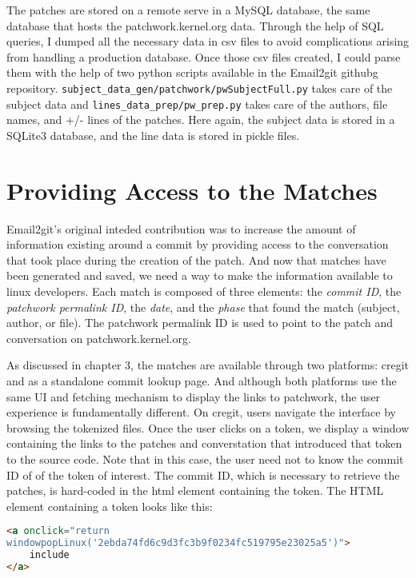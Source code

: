 The patches are stored on a remote serve in a MySQL database, the same database that hosts the patchwork.kernel.org data. Through the help of SQL queries, I dumped all the necessary data in csv files to avoid complications arising from handling a production database. Once those csv files created, I could parse them with the help of two python scripts available in the Email2git githubg repository. \texttt{subject\_data\_gen/patchwork/pwSubjectFull.py} takes care of the subject data and \texttt{lines\_data\_prep/pw\_prep.py} takes care of the authors, file names, and +/- lines of the patches. Here again, the subject data is stored in a SQLite3 database, and the line data is stored in pickle files. 







\section{Providing Access to the Matches}

Email2git's original inteded contribution was to increase the amount of information existing around a commit by providing access to the conversation that took place during the creation of the patch. And now that matches have been generated and saved, we need a way to make the information available to linux developers. Each match is composed of three elements: the \textit{commit ID}, the \textit{patchwork permalink ID}, the \textit{date}, and the \textit{phase} that found the match (subject, author, or file). The patchwork permalink ID is used to point to the patch and conversation on patchwork.kernel.org.

As discussed in chapter 3, the matches are available through two platforms: cregit and as a standalone commit lookup page. And although both platforms use the same UI and fetching mechanism to display the links to patchwork, the user experience is fundamentally different. On cregit, users navigate the interface by browsing the tokenized files. Once the user clicks on a token, we display a window containing the links to the patches and converstation that introduced that token to the source code. Note that in this case, the user need not to know the commit ID of of the token of interest. The commit ID, which is necessary to retrieve the patches, is hard-coded in the html element containing the token. The HTML element containing a token looks like this:

\begin{lstlisting}[language=HTML]
<a onclick="return 
windowpopLinux('2ebda74fd6c9d3fc3b9f0234fc519795e23025a5')">
	include
</a>
\end{lstlisting}

